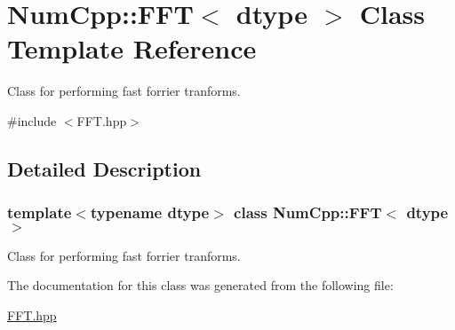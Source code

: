 \hypertarget{class_num_cpp_1_1_f_f_t}{}\section{Num\+Cpp\+:\+:F\+FT$<$ dtype $>$ Class Template Reference}
\label{class_num_cpp_1_1_f_f_t}


Class for performing fast forrier tranforms.  




{\ttfamily \#include $<$F\+F\+T.\+hpp$>$}



\subsection{Detailed Description}
\subsubsection*{template$<$typename dtype$>$\newline
class Num\+Cpp\+::\+F\+F\+T$<$ dtype $>$}

Class for performing fast forrier tranforms. 

The documentation for this class was generated from the following file\+:\begin{DoxyCompactItemize}
\item 
\mbox{\hyperlink{_f_f_t_8hpp}{F\+F\+T.\+hpp}}\end{DoxyCompactItemize}
